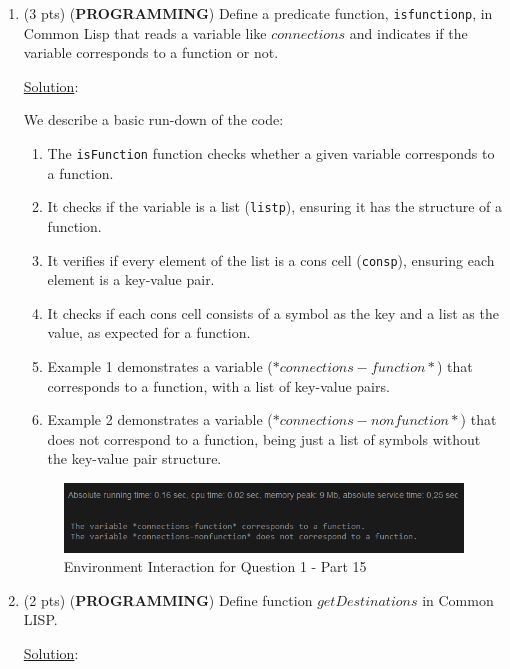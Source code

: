 \documentclass[12pt]{article}
\begin{document}
\begin{spacing}{1.5}
\begin{enumerate}
		\item (3 pts) (\textbf{PROGRAMMING}) Define a predicate function, \texttt{isfunctionp}, in Common Lisp that reads a variable like $connections$ and indicates if the variable corresponds to a function or not.
		      
		      \noindent \underline{Solution}:
		      
		      
		      
		      We describe a basic run-down of the code:
		      \begin{enumerate}
		      	\item The \texttt{isFunction} function checks whether a given variable corresponds to a function.
		      	\item It checks if the variable is a list (\texttt{listp}), ensuring it has the structure of a function.
		      	\item It verifies if every element of the list is a cons cell (\texttt{consp}), ensuring each element is a key-value pair.
		      	\item It checks if each cons cell consists of a symbol as the key and a list as the value, as expected for a function.
		      	\item Example 1 demonstrates a variable ($*connections-function*$) that corresponds to a function, with a list of key-value pairs.
		      	\item Example 2 demonstrates a variable ($*connections-nonfunction*$) that does not correspond to a function, being just a list of symbols without the key-value pair structure.
		      \end{enumerate}
		      
		      \begin{figure}[htp]
		      	\centering
		      	\includegraphics{static/isFunctionp-1-15.PNG}
		      	\caption{Environment Interaction for Question 1 - Part 15}
		      	\label{fig:figure}
		      \end{figure}
		      \newpage
		\item (2 pts) (\textbf{PROGRAMMING}) Define function $getDestinations$ in Common LISP.
		      
		      \noindent \underline{Solution}:
		      

\end{enumerate}
\end{spacing}
\end{document}
